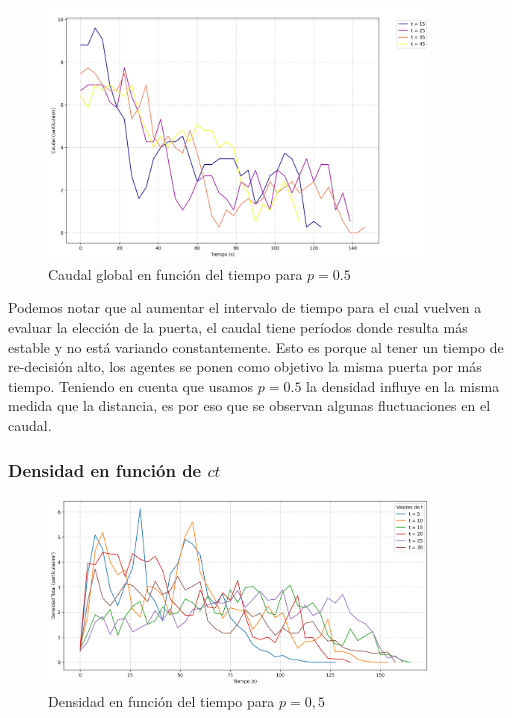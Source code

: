\documentclass[12pt]{article}
\begin{document}
\begin{figure}[H]
    \centering
    \includegraphics[width=0.9\textwidth]{img/flow_rates_p0.5.png}
    \caption{Caudal global en función del tiempo para $p=0.5$}
    \label{fig:flow_p100}
\end{figure}
Podemos notar que al aumentar el intervalo de tiempo para el cual vuelven a evaluar la elección de la puerta, el caudal tiene períodos donde resulta más estable y no está variando constantemente. Esto es porque al tener un tiempo de re-decisión alto, los agentes se ponen como objetivo la misma puerta por más tiempo. Teniendo en cuenta que usamos $p=0.5$ la densidad influye en la misma medida que la distancia, es por eso que se observan algunas fluctuaciones en el caudal.

\subsubsection{Densidad en función de $ct$}

\begin{figure}[H]
    \centering
    \includegraphics[width=0.9\textwidth]{img/density_vs_time_p0.50.png}
    \caption{Densidad en función del tiempo para $p=0,5$}
    \label{fig:flow_p100}
\end{figure}
\end{document}
